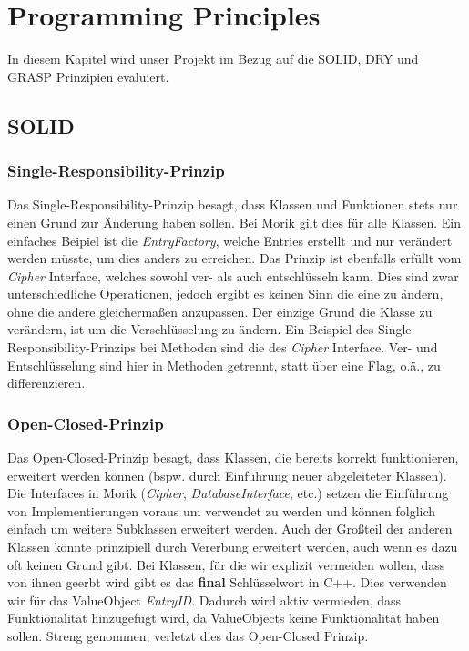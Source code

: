 \chapter{Programming Principles}

In diesem Kapitel wird unser Projekt im Bezug auf die SOLID, DRY und GRASP Prinzipien evaluiert.

\section{SOLID}

\subsection{Single-Responsibility-Prinzip}

Das Single-Responsibility-Prinzip besagt, dass Klassen und Funktionen stets nur einen Grund zur Änderung haben sollen. Bei Morik gilt dies für alle Klassen. Ein einfaches Beipiel ist die \textit{EntryFactory}, welche Entries erstellt und nur verändert werden müsste, um dies anders zu erreichen. Das Prinzip ist ebenfalls erfüllt vom \textit{Cipher} Interface, welches sowohl ver- als auch entschlüsseln kann. Dies sind zwar unterschiedliche Operationen, jedoch ergibt es keinen Sinn die eine zu ändern, ohne die andere gleichermaßen anzupassen. Der einzige Grund die Klasse zu verändern, ist um die Verschlüsselung zu ändern.
Ein Beispiel des Single-Responsibility-Prinzips bei Methoden sind die des \textit{Cipher} Interface. Ver- und Entschlüsselung sind hier in Methoden getrennt, statt über eine Flag, o.ä., zu differenzieren.

\subsection{Open-Closed-Prinzip}

Das Open-Closed-Prinzip besagt, dass Klassen, die bereits korrekt funktionieren, erweitert werden können (bspw. durch Einführung neuer abgeleiteter Klassen). 
Die Interfaces in Morik (\textit{Cipher}, \textit{DatabaseInterface}, etc.) setzen die Einführung von Implementierungen voraus um verwendet zu werden und können folglich einfach um weitere Subklassen erweitert werden. Auch der Großteil der anderen Klassen könnte prinzipiell durch Vererbung erweitert werden, auch wenn es dazu oft keinen Grund gibt. Bei Klassen, für die wir explizit vermeiden wollen, dass von ihnen geerbt wird gibt es das \textbf{final} Schlüsselwort in C++. Dies verwenden wir \zB für das ValueObject \textit{EntryID}. Dadurch wird aktiv vermieden, dass Funktionalität hinzugefügt wird, da ValueObjects keine Funktionalität haben sollen. Streng genommen, verletzt dies das Open-Closed Prinzip.

